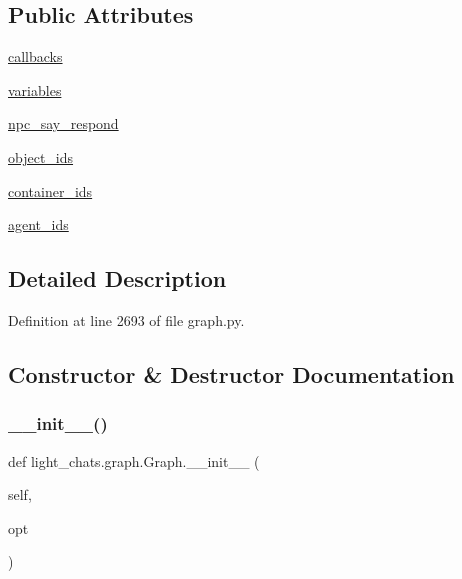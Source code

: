 \subsection*{Public Attributes}
\begin{DoxyCompactItemize}
\item 
\hyperlink{classlight__chats_1_1graph_1_1Graph_a95a1a4d31dbd607eebd593579b2d6cdd}{callbacks}
\item 
\hyperlink{classlight__chats_1_1graph_1_1Graph_a29a00f3191fb45f73bd784ed12cc2c2e}{variables}
\item 
\hyperlink{classlight__chats_1_1graph_1_1Graph_ad461dca41746ab79ffdaf70f6a9b25c4}{npc\+\_\+say\+\_\+respond}
\item 
\hyperlink{classlight__chats_1_1graph_1_1Graph_a8ac9ab3b5c6208e0df9b28d436c7c425}{object\+\_\+ids}
\item 
\hyperlink{classlight__chats_1_1graph_1_1Graph_a79bd1a69e214458644ecf74d218e476c}{container\+\_\+ids}
\item 
\hyperlink{classlight__chats_1_1graph_1_1Graph_a2bd5d1191b6a64402e7bb1f992516265}{agent\+\_\+ids}
\end{DoxyCompactItemize}


\subsection{Detailed Description}


Definition at line 2693 of file graph.\+py.



\subsection{Constructor \& Destructor Documentation}
\mbox{\label{classlight__chats_1_1graph_1_1Graph_a5bd7cc4e21edc98dcbbac1040f68c878}} 
\subsubsection{\texorpdfstring{\+\_\+\+\_\+init\+\_\+\+\_\+()}{\_\_init\_\_()}}
{\footnotesize\ttfamily def light\+\_\+chats.\+graph.\+Graph.\+\_\+\+\_\+init\+\_\+\+\_\+ (\begin{DoxyParamCaption}\item[{}]{self,  }\item[{}]{opt }\end{DoxyParamCaption})}

